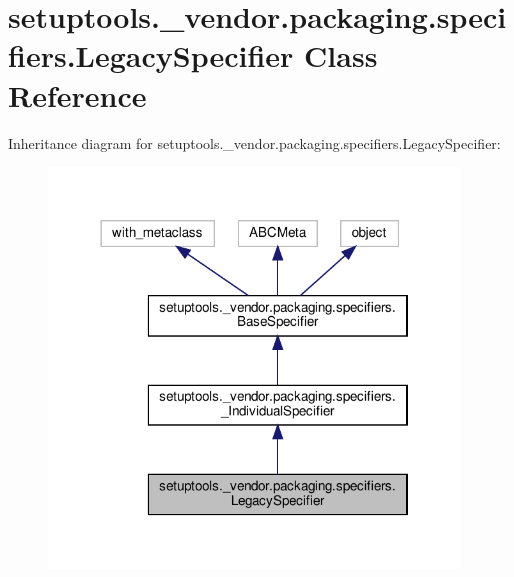 \hypertarget{classsetuptools_1_1__vendor_1_1packaging_1_1specifiers_1_1LegacySpecifier}{}\section{setuptools.\+\_\+vendor.\+packaging.\+specifiers.\+Legacy\+Specifier Class Reference}
\label{classsetuptools_1_1__vendor_1_1packaging_1_1specifiers_1_1LegacySpecifier}


Inheritance diagram for setuptools.\+\_\+vendor.\+packaging.\+specifiers.\+Legacy\+Specifier\+:
\nopagebreak
\begin{figure}[H]
\begin{center}
\leavevmode
\includegraphics[width=310pt]{classsetuptools_1_1__vendor_1_1packaging_1_1specifiers_1_1LegacySpecifier__inherit__graph}
\end{center}
\end{figure}



